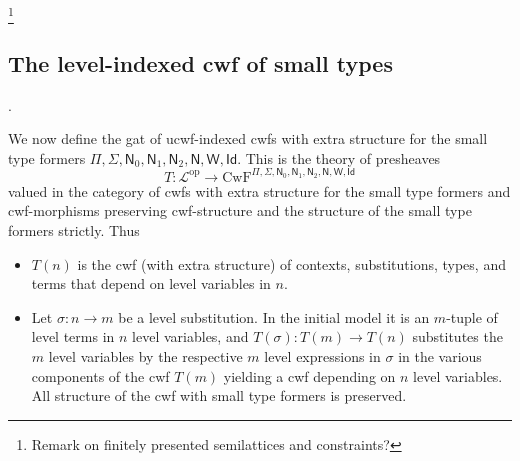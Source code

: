 \documentclass[11pt,a4paper]{article}
\theoremstyle{plain}
\theoremstyle{definition}
\newcommand{\Id}{\mathsf{Id}}
\newcommand{\refl}{\mathsf{r}}
\newcommand{\MB}[1]{{\color{red}{#1}}}
\newcommand{\N}{\mathsf{N}}
\def\lctx{\mathrm{lctx}}
\def\ltm{\mathrm{ltm}}
\def\leq{\mathrm{leq}}
\def\L{{\mathcal{L}}}
\def\CwF{\mathrm{CwF}}
\def\W{\mathsf{W}}
\begin{document}
%



\footnote{Remark on finitely presented semilattices and constraints?}


\subsection{The level-indexed cwf of small types}\label{lcwf-sort}.

We now define the gat of ucwf-indexed cwfs with extra structure for the small type formers $\Pi,\Sigma,\N_0,\N_1,\N_2,\N,\W,\Id$. This is the theory of presheaves
$$
T : \L^\mathrm{op} \to \CwF^{\Pi,\Sigma,\N_0,\N_1,\N_2,\N,\W,\Id}
$$
valued in the category of cwfs with extra structure for the small type formers and cwf-morphisms preserving cwf-structure and the structure of the small type formers strictly. Thus
\begin{itemize}
\item
$T(n)$ is the cwf (with extra structure) of contexts, substitutions, types, and terms that depend on level variables in $n$.
\item
Let $\sigma : n \to m$ be a level substitution. In the initial model it is an $m$-tuple of level terms in $n$ level variables, and 
$T(\sigma) : T(m) \to T(n)$ substitutes the $m$ level variables by the respective $m$ level expressions in $\sigma$ in the various components of the cwf $T(m)$ yielding a cwf depending on $n$ level variables. All structure of the cwf with small type formers is preserved.
\end{itemize}
\end{document}
